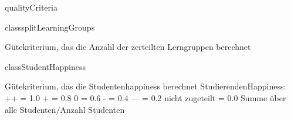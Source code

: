 \begin{texdocpackage}{qualityCriteria}
\begin{texdocclass}{class}{splitLearningGroups}
\label{texdoclet:qualityCriteria.splitLearningGroups}
\begin{texdocclassintro}
Gütekriterium, das die Anzahl der zerteilten Lerngruppen berechnet\end{texdocclassintro}
\begin{texdocclassconstructors}
\end{texdocclassconstructors}
\begin{texdocclassmethods}
\end{texdocclassmethods}
\end{texdocclass}


\begin{texdocclass}{class}{StudentHappiness}
\label{texdoclet:qualityCriteria.StudentHappiness}
\begin{texdocclassintro}
Gütekriterium, das die Studentenhappiness berechnet 
 StudierendenHappiness:
++ = 1.0
+ = 0.8
0 = 0.6
- = 0.4
— = 0.2
nicht zugeteilt = 0.0
Summe über alle Studenten$/$Anzahl Studenten\end{texdocclassintro}
\begin{texdocclassconstructors}
\end{texdocclassconstructors}
\begin{texdocclassmethods}
\end{texdocclassmethods}
\end{texdocclass}


\end{texdocpackage}




